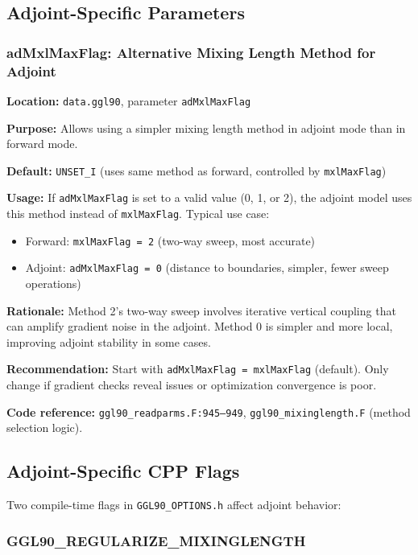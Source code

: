 \documentclass[12pt,letterpaper]{article}
\begin{document}
\subsection{Adjoint-Specific Parameters}

\subsubsection{adMxlMaxFlag: Alternative Mixing Length Method for Adjoint}

\textbf{Location:} \texttt{data.ggl90}, parameter \texttt{adMxlMaxFlag}

\textbf{Purpose:} Allows using a simpler mixing length method in adjoint mode than in forward mode.

\textbf{Default:} \texttt{UNSET\_I} (uses same method as forward, controlled by \texttt{mxlMaxFlag})

\textbf{Usage:} If \texttt{adMxlMaxFlag} is set to a valid value (0, 1, or 2), the adjoint model uses this method instead of \texttt{mxlMaxFlag}. Typical use case:
\begin{itemize}[leftmargin=*]
  \item Forward: \texttt{mxlMaxFlag = 2} (two-way sweep, most accurate)
  \item Adjoint: \texttt{adMxlMaxFlag = 0} (distance to boundaries, simpler, fewer sweep operations)
\end{itemize}

\textbf{Rationale:} Method 2's two-way sweep involves iterative vertical coupling that can amplify gradient noise in the adjoint. Method 0 is simpler and more local, improving adjoint stability in some cases.

\textbf{Recommendation:} Start with \texttt{adMxlMaxFlag = mxlMaxFlag} (default). Only change if gradient checks reveal issues or optimization convergence is poor.

\textbf{Code reference:} \texttt{ggl90\_readparms.F:945--949}, \texttt{ggl90\_mixinglength.F} (method selection logic).

\subsection{Adjoint-Specific CPP Flags}

Two compile-time flags in \texttt{GGL90\_OPTIONS.h} affect adjoint behavior:

\subsubsection{GGL90\_REGULARIZE\_MIXINGLENGTH}
\end{document}
